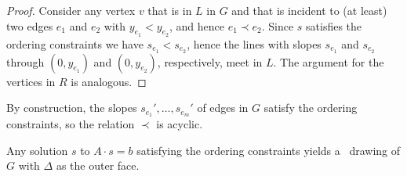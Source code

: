 \begin{proof}	  
Consider any vertex $v$ that is in $L$ in $G$ and that is incident to
(at least) two edges $e_1$ and $e_2$ with $y_{e_1} < y_{e_2}$, and hence $e_1 \prec e_2$. Since $s$ satisfies the ordering constraints we have $s_{e_1} < s_{e_2}$, hence the lines with slopes $s_{e_1}$ and $s_{e_2}$ through $(0,y_{e_1})$ and $(0,y_{e_2})$, respectively, meet in $L$. The argument for the vertices in $R$ is analogous. 
\end{proof}	  

By construction, the slopes $s_{e_1}',\ldots,s_{e_m}'$ of edges
in $G$ satisfy the ordering constraints, so the relation $\prec$ is acyclic.

\begin{lem}
	Any solution $s$ to $A\cdot s=b$ satisfying
	the ordering constraints %
	yields a
	\Fary\ drawing of $G$ with $\Delta$ as the outer face.
\end{lem}

